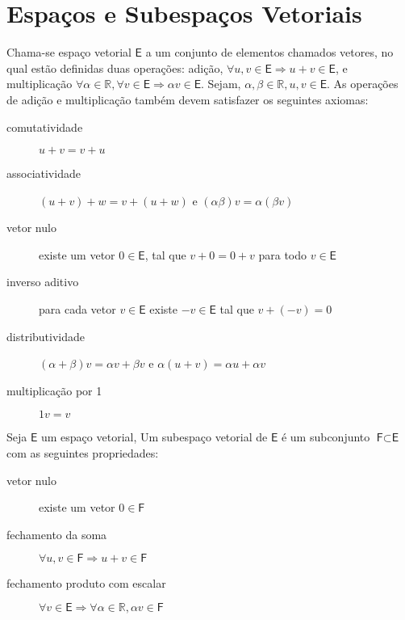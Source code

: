 \documentclass[10pt,a4paper]{article}
\begin{document}
\section{Espaços e Subespaços Vetoriais}

\begin{definition}
	Chama-se espaço vetorial $\textsf{E}$ a um conjunto de elementos chamados vetores, no qual estão
	definidas duas operações: adição, $\forall u, v \in \textsf{E} \Rightarrow u+v \in \textsf{E}$,  e multiplicação $\forall \alpha \in \mathbb{R},  \forall v \in \textsf{E} \Rightarrow \alpha v \in \textsf{E}$. Sejam, $\alpha, \beta \in \mathbb{R}, u, v \in \textsf{E}$. As operações de adição e multiplicação também devem satisfazer os seguintes axiomas:
	\begin{description}
		\item[comutatividade     ] $u+v = v+u$
		\item[associatividade    ] $(u+v)+w = v+(u+w)$ e $(\alpha \beta)v = \alpha (\beta v)$
		\item[vetor nulo         ] existe um vetor $0 \in \textsf{E}$, tal que $v + 0 = 0 + v$ para todo $v \in \textsf{E}$
		\item[inverso aditivo    ] para cada vetor $v \in \textsf{E}$ existe $-v \in \textsf{E}$ tal que $v + (-v) = 0$
		\item[distributividade   ] $(\alpha + \beta)v = \alpha v + \beta v$ e $\alpha(u + v) = \alpha u + \alpha v$
		\item[multiplicação por 1] $1 v = v$
	\end{description}
\end{definition}


\begin{definition}
	Seja $\textsf{E}$ um espaço vetorial, Um subespaço vetorial de $\textsf{E}$ é um subconjunto $\textsf{F} \subset \textsf{E}$ com as seguintes propriedades:
	\begin{description}
		\item[vetor nulo         ] existe um vetor $0 \in \textsf{F}$
		\item[fechamento da soma] $\forall u, v \in \textsf{F} \Rightarrow u+v \in \textsf{F}$
		\item[fechamento produto com escalar] $\forall v \in \textsf{E} \Rightarrow \forall \alpha \in \mathbb{R}, \alpha v \in \textsf{F}$
	\end{description}
\end{definition}
\end{document}
